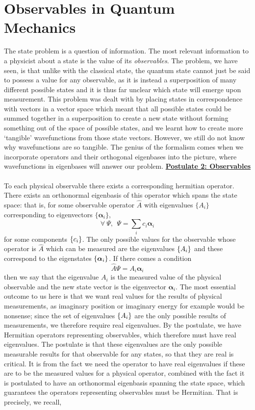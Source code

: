 \section{Observables in Quantum Mechanics}
The state problem is a question of information. The most relevant information to a physicist about a state is the value of its \textit{observables}. The problem, we have seen, is that unlike with the classical state, the quantum state cannot just be said to possess a value for any observable, as it is instead a superposition of many different possible states and it is thus far unclear which state will emerge upon measurement. This problem was dealt with by placing states in correspondence with vectors in a vector space which meant that all possible states could be summed together in a superposition to create a new state without forming something out of the space of possible states, and we learnt how to create more `tangible' wavefunctions from those state vectors. However, we still do not know why wavefunctions are so tangible. The genius of the formalism comes when we incorporate operators and their orthogonal eigenbases into the picture, where wavefunctions in eigenbases will answer our problem.
\Answer
\underline{\textbf{Postulate 2: Observables}}\\\\
To each physical observable there exists a corresponding hermitian operator. There exists an orthonormal eigenbasis of this operator which spans the state space: that is, for some observable operator $\hat{A}$ with eigenvalues $\{A_{i}\}$ corresponding to eigenvectors $\{\bm{\alpha}_{i}\}$,
$$
\forall\:\Psi, \:\: \Psi=\sum_{i}c_{i}\bm{\alpha}_{i}
$$
for some components $\{c_{i}\}$. The only possible values for the observable whose operator is $\hat{A}$ which can be measured are the eigenvalues $\{A_{i}\}$ and these correspond to the eigenstates $\{\bm{\alpha}_{i}\}$. If there comes a condition 
$$
\hat{A}\Psi=A_{i}\bm{\alpha}_{i}
$$
then we say that the eigenvalue $A_{i}$ is the measured value of the physical observable and the new state vector is the eigenvector $\bm{\alpha}_{i}$. 
\Answerend
The most essential outcome to us here is that we want real values for the results of physical measurements, as imaginary position or imaginary energy for example would be nonsense; since the set of eigenvalues $\{A_{i}\}$ are the only possible results of measurements, we therefore require real eigenvalues. By the postulate, we have Hermitian operators representing observables, which therefore must have real eigenvalues. The postulate is that these eigenvalues are the only possible measurable results for that observable for any states, so that they are real is critical. It is from the fact we need the operator to have real eigenvalues if these are to be the measured values for a physical operator, combined with the fact it is postulated to have an orthonormal eigenbasis spanning the state space, which guarantees the operators representing observables must be Hermitian. That is precisely, we recall,
